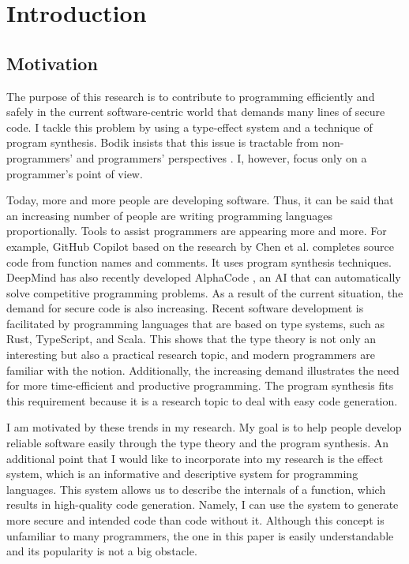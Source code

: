 \documentclass[12pt, a4paper, titlepage]{report}
\begin{document}
\chapter{Introduction}\label{chapter:introduction}
  \section{Motivation}
    The purpose of this research is to contribute to programming efficiently and safely in the current software-centric world that demands many lines of secure code.
    I tackle this problem by using a type-effect system and a technique of program synthesis.
    Bodik insists that this issue is tractable from non-programmers' and programmers' perspectives \cite{bodik:2015}.
    I, however, focus only on a programmer's point of view.

    Today, more and more people are developing software.
    Thus, it can be said that an increasing number of people are writing programming languages proportionally.
    Tools to assist programmers are appearing more and more.
    For example, GitHub Copilot based on the research by Chen et al. \cite{Chen:2021} completes source code from function names and comments.
    It uses program synthesis techniques.
    DeepMind has also recently developed AlphaCode \cite{Li:2022}, an AI that can automatically solve competitive programming problems.
    As a result of the current situation, the demand for secure code is also increasing.
    Recent software development is facilitated by programming languages that are based on type systems, such as Rust, TypeScript, and Scala.
    This shows that the type theory is not only an interesting but also a practical research topic, and modern programmers are familiar with the notion.
    Additionally, the increasing demand illustrates the need for more time-efficient and productive programming.
    The program synthesis fits this requirement because it is a research topic to deal with easy code generation.

    I am motivated by these trends in my research.
    My goal is to help people develop reliable software easily through the type theory and the program synthesis.
    An additional point that I would like to incorporate into my research is the effect system, which is an informative and descriptive system for programming languages.
    This system allows us to describe the internals of a function, which results in high-quality code generation.
    Namely, I can use the system to generate more secure and intended code than code without it.
    Although this concept is unfamiliar to many programmers, the one in this paper is easily understandable and its popularity is not a big obstacle.
\end{document}
